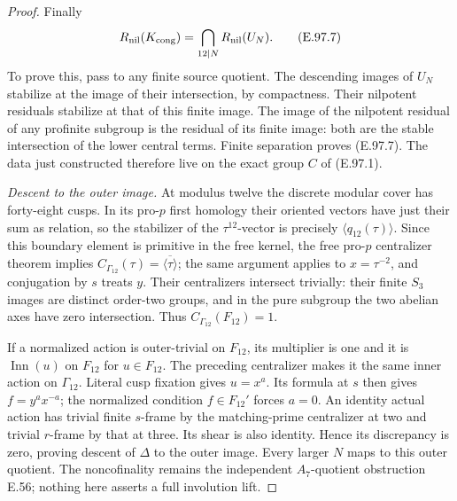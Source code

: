 \begin{proof}
Finally
\[
 R_{\rm nil}(K_{\rm cong})
       =\bigcap_{12\mid N}R_{\rm nil}(U_N).              \tag{E.97.7}
\]
To prove this, pass to any finite source quotient.
The descending images of \(U_N\) stabilize at the image
of their intersection, by compactness.  Their nilpotent
residuals stabilize at that of this finite image.
The image of the nilpotent residual of any profinite
subgroup is the residual of its finite image: both are
the stable intersection of the lower central terms.
Finite separation proves (E.97.7).
The data just constructed therefore live on the exact
group \(C\) of (E.97.1).

\emph{Descent to the outer image.}
At modulus twelve the discrete modular cover has forty-eight
cusps.  In its pro-\(p\) first homology their oriented vectors
have just their sum as relation, so the stabilizer of the
\(\tau^{12}\)-vector is precisely \(\langle q_{12}(\tau)\rangle\).
Since this boundary element is primitive in the free kernel,
the free pro-\(p\) centralizer theorem implies
\(C_{\Gamma_{12}}(\tau)=\overline{\langle\tau\rangle}\);
the same argument applies to \(x=\tau^{-2}\), and conjugation
by \(s\) treats \(y\).
Their centralizers intersect trivially: their finite \(S_3\)
images are distinct order-two groups, and in the pure
subgroup the two abelian axes have zero intersection.
Thus \(C_{\Gamma_{12}}(F_{12})=1\).

If a normalized action is outer-trivial on \(F_{12}\),
its multiplier is one and it is \(\operatorname{Inn}(u)\)
on \(F_{12}\) for \(u\in F_{12}\).
The preceding centralizer makes it the same inner action
on \(\Gamma_{12}\).  Literal cusp fixation gives \(u=x^a\).
Its formula at \(s\) then gives \(f=y^ax^{-a}\);
the normalized condition \(f\in F_{12}'\) forces \(a=0\).
An identity actual action has trivial finite \(s\)-frame
by the matching-prime centralizer at two and trivial
\(r\)-frame by that at three.  Its shear is also identity.
Hence its discrepancy is zero, proving descent of
\(\Delta\) to the outer image.
Every larger \(N\) maps to this outer quotient.
The noncofinality remains the independent \(A_7\)-quotient
obstruction E.56; nothing here asserts a full involution lift.
\end{proof}
